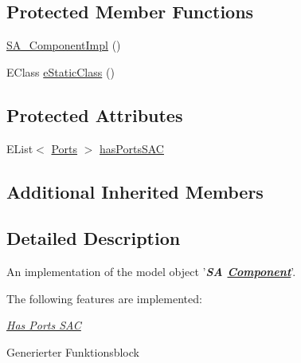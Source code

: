 \subsection*{Protected Member Functions}
\begin{DoxyCompactItemize}
\item 
\hyperlink{classshootingmachineemfmodel_1_1impl_1_1_s_a___component_impl_a51550527fcfd4532f706d85f00d876a1}{S\-A\-\_\-\-Component\-Impl} ()
\item 
E\-Class \hyperlink{classshootingmachineemfmodel_1_1impl_1_1_s_a___component_impl_ae4030fdfb45f0e29fca784018f62da21}{e\-Static\-Class} ()
\end{DoxyCompactItemize}
\subsection*{Protected Attributes}
\begin{DoxyCompactItemize}
\item 
E\-List$<$ \hyperlink{interfaceshootingmachineemfmodel_1_1_ports}{Ports} $>$ \hyperlink{classshootingmachineemfmodel_1_1impl_1_1_s_a___component_impl_a359f485fb955ec6fe15f6ac9986ba568}{has\-Ports\-S\-A\-C}
\end{DoxyCompactItemize}
\subsection*{Additional Inherited Members}


\subsection{Detailed Description}
An implementation of the model object '{\itshape {\bfseries S\-A \hyperlink{interfaceshootingmachineemfmodel_1_1_component}{Component}}}'.

The following features are implemented\-: 
\begin{DoxyItemize}
\item \hyperlink{classshootingmachineemfmodel_1_1impl_1_1_s_a___component_impl_a33cf8cec28514b7843445dc395c5b072}{{\itshape Has Ports S\-A\-C}} 
\end{DoxyItemize}

Generierter Funktionsblock 

